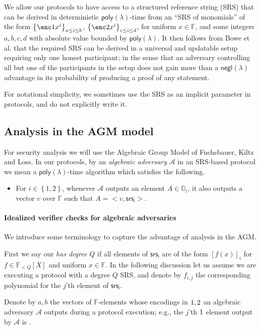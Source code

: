 \documentclass[11pt]{article} %
\newcommand{\Gi}{\ensuremath{{\mathbb G}_i}\xspace}
\newcommand{\F}{\ensuremath{\mathbb F}\xspace}
\newcommand{\adv}{\ensuremath{\mathcal A}\xspace}
\newcommand{\srsi}{\ensuremath{\mathsf{srs_i}}\xspace}
\newcommand{\negl}{\ensuremath{\mathsf{negl}(\lambda)}\xspace}
\newcommand{\sett}[2]{\ensuremath{\set{#1}_{#2}}\xspace}
\newcommand{\enci}[1]{\ensuremath{\left[#1\right]_i}\xspace}
\newcommand{\set}[1]{\ensuremath{\left\{#1\right\}}\xspace}
\newcommand{\polysofdeg}[1]{\ensuremath{\F_{< #1}[X]}\xspace}
\newcommand{\poly}{\ensuremath{\mathsf{poly(\lambda)}}\xspace}
\begin{document}
We allow our protocols to have access to a structured reference string (SRS) that can be derived in deterministic \poly-time from an ``SRS of monomials'' of the form
\sett{\enc1{x^i}}{a\leq i \leq b}, \sett{\enc2{x^i}}{c\leq i \leq d}, for uniform $x\in \F$,
and some integers $a,b,c,d$ with absolute value bounded by \poly.
It then follows from Bowe et al. \cite{SecondMPC} that the required SRS can be derived in a universal and updatable setup requiring only one honest participant; in the sense that an adversary controlling all but one of the participants in the setup does not gain more than a \negl advantage in its probability of producing a proof of any statement.

For notational simplicity, we sometimes use the SRS  as an implicit parameter in protocols, and do not explicitly write it.

\subsection{Analysis in the AGM model}\label{subsec:AGM}
For security analysis we will use the Algebraic Group Model of Fuchsbauer, Kiltz and Loss\cite{AGM}.
In our protocols, by an \emph{algebraic adversary} \adv in an SRS-based protocol we mean a \poly-time algorithm which satisfies the following.
\begin{itemize}
 \item For $i\in \set{1,2}$, whenever \adv outputs an element $A\in \Gi$, it also outputs a vector $v$ over \F such that $A = <v,\srsi>$.
\end{itemize}

\paragraph{Idealized verifier checks for algebraic adversaries}
We introduce some terminology to capture the advantage of analysis in the AGM.

First we say our  \emph{has degree $Q$} if all elements of \srsi are of the form  \enci{f(x)} for $f\in \polysofdeg{Q}$ and uniform $x\in \F$. In the following discussion let us assume we are executing a protocol with a degree $Q$ SRS, and denote by $f_{i,j}$ the corresponding polynomial for the $j$'th element of \srsi.

Denote by $a,b$ the vectors of $\F$-elements whose encodings in $\G1,\G2$ an algebraic adversary \adv outputs during a protocol execution; e.g., the $j$'th $\G1$ element output by \adv is .
\end{document}
